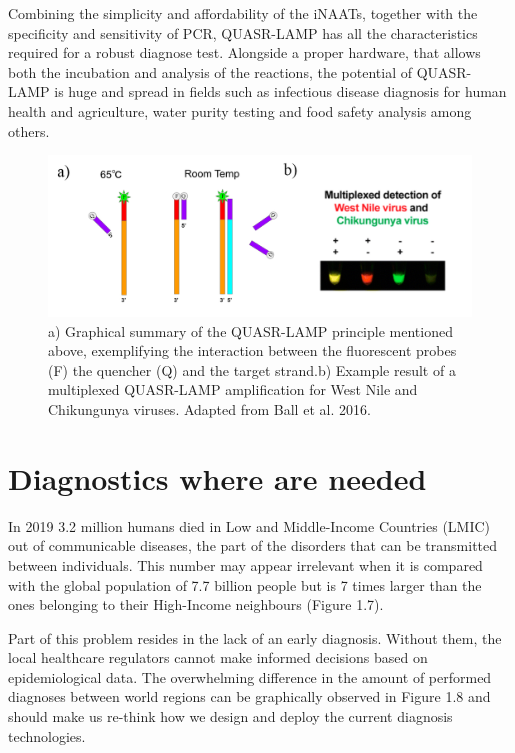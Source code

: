 Combining the simplicity and affordability of the iNAATs, together with the specificity and sensitivity of PCR, QUASR-LAMP has all the characteristics required for a robust diagnose test. Alongside a proper hardware, that allows both the incubation and analysis of the reactions, the potential of QUASR-LAMP is huge and spread in fields such as infectious disease diagnosis for human health and agriculture, water purity testing and food safety analysis among others.

\begin{figure}[h]
    \centering
    \includegraphics[width=1\textwidth]{figures/QUASR.JPG}
    \caption{a) Graphical summary of the QUASR-LAMP principle mentioned above, exemplifying the interaction between the fluorescent probes (F) the quencher (Q) and the target strand.b) Example result of a multiplexed QUASR-LAMP amplification for West Nile and Chikungunya viruses. Adapted from Ball et al. 2016\cite{ball_quenching_2016}.}
    \label{fig:QUASR}
\end{figure}

\newpage
\section{Diagnostics where are needed}
In 2019 3.2 million humans died in Low and Middle-Income Countries (LMIC) out of communicable diseases\cite{institute_for_health_metrics_and_evaluation_ihme_uniersity_of_washington_gbd_2015}, the part of the disorders that can be transmitted between individuals. This number may appear irrelevant when it is compared with the global population of 7.7 billion people\cite{worldometer_worldometer_2022} but is 7 times larger than the ones belonging to their High-Income neighbours (Figure 1.7). 

Part of this problem resides in the lack of an early diagnosis. Without them, the local healthcare regulators cannot make informed decisions based on epidemiological data. The overwhelming difference in the amount of performed diagnoses between world regions can be graphically observed in Figure 1.8 and should make us re-think how we design and deploy the current diagnosis technologies. 

